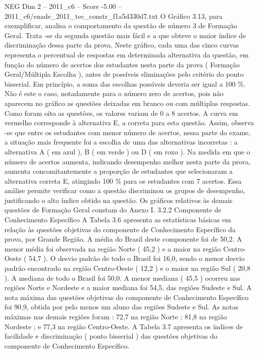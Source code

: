 \begin{textsample}{NEG Dim 2 – 2011\_c6 – Score -5.00 – 2011\_c6/enade\_2011\_tec\_constr\_f1a5d330d7.txt}
O Gráfico 3.13, para exemplificar, analisa o comportamento da questão de número 3 de Formação Geral.
Trata -se da segunda questão mais fácil e a que obteve o maior índice de discriminação dessa parte da prova.
Neste gráfico, cada uma das cinco curvas representa o percentual de respostas em determinada alternativa da questão, em função do número de acertos dos estudantes nesta parte da prova ( Formação Geral/Múltipla Escolha ), antes de possíveis eliminações pelo critério do ponto bisserial.
Em princípio, a soma das escolhas possíveis deveria ser igual a 100 \%.
Não é este o caso, notadamente para o número zero de acertos, pois não aparecem no gráfico as questões deixadas em branco ou com múltiplas respostas.
Como foram oito as questões, os valores variam de 0 a 8 acertos.
A curva em vermelho corresponde à alternativa E, a correta para esta questão.
Assim, observa -se que entre os estudantes com menor número de acertos, nessa parte do exame, a situação mais frequente foi a escolha de uma das alternativas incorretas : a alternativa A ( em azul ), B ( em verde ) ou D ( em roxo ).
Na medida em que o número de acertos aumenta, indicando desempenho melhor nesta parte da prova, aumenta concomitantemente a proporção de estudantes que selecionaram a alternativa correta E, atingindo 100 \% para os estudantes com 7 acertos.
Essa análise permite verificar como a questão discriminou os grupos de desempenho, justificando o alto índice obtido na questão.
Os gráficos relativos às demais questões de Formação Geral constam do Anexo I. 3.2.2 Componente de Conhecimento Específico A Tabela 3.6 apresenta as estatísticas básicas em relação às questões objetivas do componente de Conhecimento Específico da prova, por Grande Região.
A média do Brasil deste componente foi de 50,2.
A menor média foi observada na região Norte ( 45,2 ) e a maior na região Centro-Oeste ( 54,7 ).
O desvio padrão de todo o Brasil foi 16,0, sendo o menor desvio padrão encontrado na região Centro-Oeste ( 12,2 ) e o maior na região Sul ( 20,8 ).
A mediana de todo o Brasil foi 50,0.
A menor mediana ( 45,5 ) ocorreu nas regiões Norte e Nordeste e a maior mediana foi 54,5, das regiões Sudeste e Sul.
A nota máxima das questões objetivas do componente de Conhecimento Específico foi 90,9, obtida por pelo menos um aluno das regiões Sudeste e Sul.
As notas máximas nas demais regiões foram : 72,7 na região Norte ; 81,8 na região Nordeste ; e 77,3 na região Centro-Oeste.
A Tabela 3.7 apresenta os índices de facilidade e discriminação ( ponto bisserial ) das questões objetivas do componente de Conhecimento Específico.

\end{textsample}
